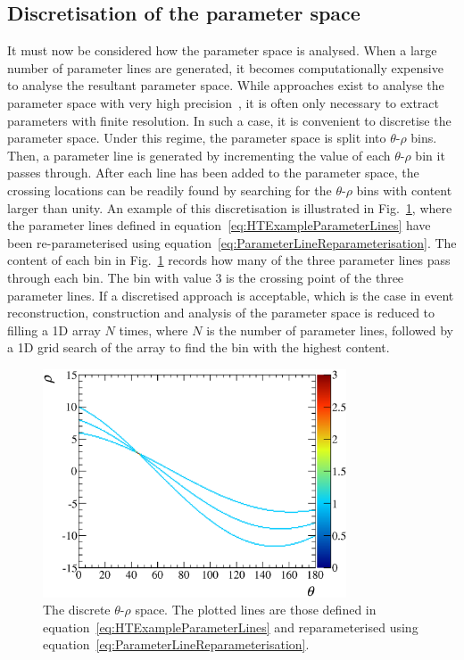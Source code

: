\subsection{Discretisation of the parameter space}
\label{subsec:ParameterSpaceDiscretisation}
It must now be considered how the parameter space is analysed.  When a large number of parameter lines are generated, it becomes computationally expensive to analyse the resultant parameter space.  While approaches exist to analyse the parameter space with very high precision~\cite{331821}, it is often only necessary to extract parameters with finite resolution.  In such a case, it is convenient to discretise the parameter space.  Under this regime, the parameter space is split into $\theta$-$\rho$ bins.  Then, a parameter line is generated by incrementing the value of each $\theta$-$\rho$ bin it passes through.  After each line has been added to the parameter space, the crossing locations can be readily found by searching for the $\theta$-$\rho$ bins with content larger than unity.  An example of this discretisation is illustrated in Fig.~\ref{fig:BinnedParameterSpace}, where the parameter lines defined in equation~\ref{eq:HTExampleParameterLines} have been re-parameterised using equation~\ref{eq:ParameterLineReparameterisation}.  The content of each bin in Fig.~\ref{fig:BinnedParameterSpace} records how many of the three parameter lines pass through each bin.  The bin with value 3 is the crossing point of the three parameter lines.
\newline
\newline
If a discretised approach is acceptable, which is the case in event reconstruction, construction and analysis of the parameter space is reduced to filling a 1D array $N$ times, where $N$ is the number of parameter lines, followed by a 1D grid search of the array to find the bin with the highest content.
\begin{figure}
  \centering
  \includegraphics[width=9cm]{images/hough_transform/binned_parameter_space}
  \caption{The discrete $\theta$-$\rho$ space.  The plotted lines are those defined in equation~\ref{eq:HTExampleParameterLines} and reparameterised using equation~\ref{eq:ParameterLineReparameterisation}.}
  \label{fig:BinnedParameterSpace}
\end{figure}



